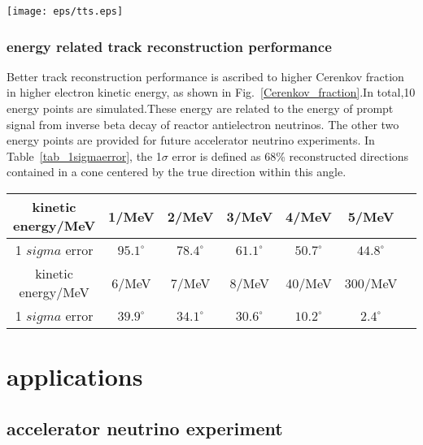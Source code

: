 \documentclass[a4paper,10pt]{cpc-hepnp}
\begin{document}
\begin{center}
\texttt{[image: eps/tts.eps]}
\end{center}

\subsubsection{energy related track reconstruction performance}
Better track reconstruction performance is ascribed to higher Cerenkov fraction in higher electron kinetic energy,
as shown in Fig.~\ref{Cerenkov_fraction}.In total,10 energy points are simulated.These energy are related to the
energy of prompt signal
from inverse beta decay of reactor antielectron neutrinos. The other two  energy points are provided for future
accelerator neutrino experiments. In  Table~\ref{tab_1sigmaerror}, the 1$\sigma$ error is defined as 68\% reconstructed directions
contained in a cone centered by the true direction within this angle.




\begin{center}
\footnotesize
\begin{tabular*}{190mm}{@{\extracolsep{\fill}}ccccccc}
\toprule kinetic energy/MeV & 1/MeV  & 2/MeV &  3/MeV & 4/MeV &  5/MeV \\
\hline
1 $sigma$ error\hphantom{00} & $95.1^{\circ}$&$78.4^{\circ}$ &$61.1^{\circ}$ &$50.7^{\circ}$&$44.8^{\circ}$\\
\toprule kinetic energy/MeV & 6/MeV & 7/MeV & 8/MeV & 40/MeV & 300/MeV\\
\hline
1 $sigma$ error\hphantom{00} & $39.9^{\circ}$ &$34.1^{\circ}$&$30.6^{\circ}$&$10.2^{\circ}$&$2.4^{\circ}$\\
\bottomrule
\end{tabular*}%
\end{center}






\section{applications}
\subsection{accelerator neutrino experiment}
\end{document}
